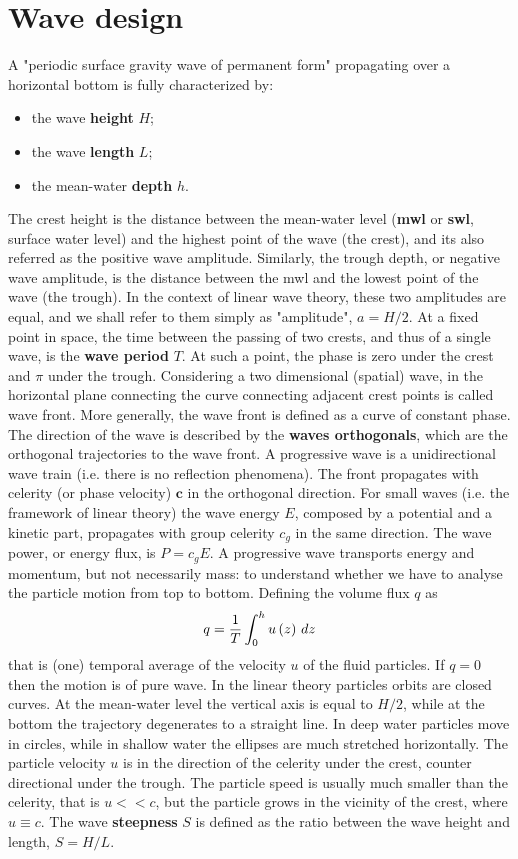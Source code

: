 \section{Wave design}
A "periodic surface gravity wave of permanent form" propagating over a horizontal bottom is fully characterized by:
\begin{itemize}
\item the wave \textbf{height} $H$;
\item the wave \textbf{length} $L$;
\item the mean-water \textbf{depth} $h$.
\end{itemize}
The crest height is the distance between the mean-water level (\textbf{mwl} or \textbf{swl}, surface water level) and the highest point of the wave (the crest), and its also referred as the positive wave amplitude. Similarly, the trough depth, or negative wave amplitude, is the distance between the mwl and the lowest point of the wave (the trough). In the context of linear wave theory, these two amplitudes are equal, and we shall refer to them simply as "amplitude", $a=H/2$. At a fixed point in space, the time between the passing of two crests, and thus of a single wave, is the \textbf{wave period} $T$. At such a point, the phase is zero under the crest and $\pi$ under the trough. Considering a two dimensional (spatial) wave, in the horizontal plane connecting the curve connecting adjacent crest points is called wave front. More generally, the wave front is defined as a curve of constant phase. The direction of the wave is described by the \textbf{waves orthogonals}, which are the orthogonal trajectories to the wave front. A progressive wave is a unidirectional wave train (i.e. there is no reflection phenomena). The front propagates with celerity (or phase velocity) $\mathbf{c}$ in the orthogonal direction. For small waves (i.e. the framework of linear theory) the wave energy $E$, composed by a potential and a kinetic part, propagates with group celerity $c_{g}$ in the same direction. The wave power, or energy flux, is $P=c_{g} E$. A progressive wave transports energy and momentum, but not necessarily mass: to understand whether we have to analyse the particle motion from top to bottom. Defining the volume flux $q$ as 
\begin{equation}
q=\dfrac{1}{T}\int_{0}^{h}u\left( z \right)\,dz
\end{equation}
that is (one) temporal average of the velocity $u$ of the fluid particles. If $q=0$ then the motion is of pure wave. In the linear theory particles orbits are closed curves. At the mean-water level the vertical axis is equal to $H/2$, while at the bottom the trajectory degenerates to a straight line. In deep water particles move in circles, while in shallow water the ellipses are much stretched horizontally. The particle velocity $u$ is in the direction of the celerity under the crest, counter directional under the trough. The particle speed is usually much smaller than the celerity, that is $u<<c$, but the particle grows in the vicinity of the crest, where $u\equiv c$. The wave \textbf{steepness} $S$ is defined as the ratio between the wave height and length, $S=H/L$.
